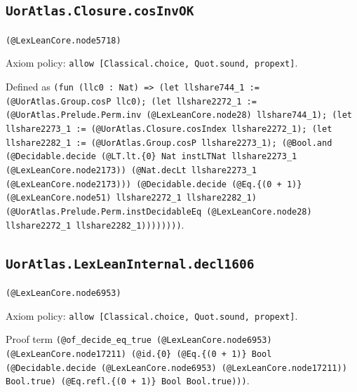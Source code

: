 \documentclass[11pt]{article}
\begin{document}
\subsection*{\texttt{UorAtlas.Closure.cosInvOK}}
\noindent\texttt{(@LexLeanCore.node5718)}\par
\noindent Axiom policy: \texttt{allow [Classical.choice, Quot.sound, propext]}.\par
\noindent Defined as \texttt{(fun (llc0 : Nat) => (let llshare744\_1 := (@UorAtlas.Group.cosP llc0); (let llshare2272\_1 := (@UorAtlas.Prelude.Perm.inv (@LexLeanCore.node28) llshare744\_1); (let llshare2273\_1 := (@UorAtlas.Closure.cosIndex llshare2272\_1); (let llshare2282\_1 := (@UorAtlas.Group.cosP llshare2273\_1); (@Bool.and (@Decidable.decide (@LT.lt.\{0\} Nat instLTNat llshare2273\_1 (@LexLeanCore.node2173)) (@Nat.decLt llshare2273\_1 (@LexLeanCore.node2173))) (@Decidable.decide (@Eq.\{(0 + 1)\} (@LexLeanCore.node51) llshare2272\_1 llshare2282\_1) (@UorAtlas.Prelude.Perm.instDecidableEq (@LexLeanCore.node28) llshare2272\_1 llshare2282\_1))))))))}.\par
\subsection*{\texttt{UorAtlas.LexLeanInternal.decl1606}}
\noindent\texttt{(@LexLeanCore.node6953)}\par
\noindent Axiom policy: \texttt{allow [Classical.choice, Quot.sound, propext]}.\par
\noindent Proof term \texttt{(@of\_decide\_eq\_true (@LexLeanCore.node6953) (@LexLeanCore.node17211) (@id.\{0\} (@Eq.\{(0 + 1)\} Bool (@Decidable.decide (@LexLeanCore.node6953) (@LexLeanCore.node17211)) Bool.true) (@Eq.refl.\{(0 + 1)\} Bool Bool.true)))}.\par
\end{document}
